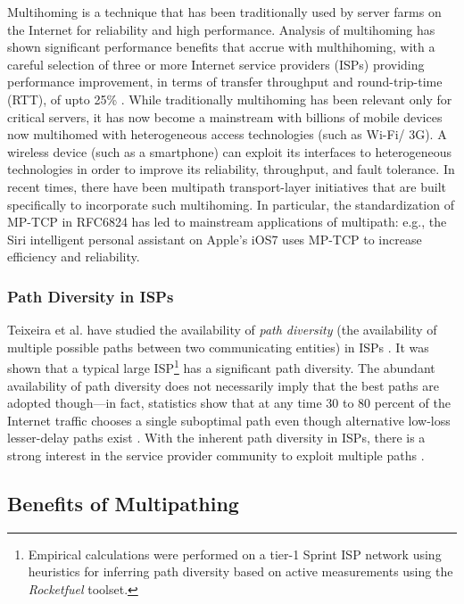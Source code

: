 \documentclass[10pt]{IEEEtran}
\begin{document}
Multihoming is a technique that has been traditionally used by server farms on the Internet for reliability and high performance. Analysis of multihoming has shown significant performance benefits that accrue with multhihoming, with a careful selection of three or more Internet service providers (ISPs) providing performance improvement, in terms of transfer throughput and round-trip-time (RTT), of upto 25\% \cite{akella2003measurement}. While traditionally multihoming has been relevant only for critical servers, it has now become a mainstream with billions of mobile devices now multihomed with heterogeneous access technologies (such as Wi-Fi/ 3G). A wireless device (such as a smartphone) can exploit its interfaces to heterogeneous technologies in order to improve its reliability, throughput, and fault tolerance. In recent times, there have been multipath transport-layer initiatives that are built specifically to incorporate such multihoming. In particular, the standardization of MP-TCP \cite{Paasch:2014:MT:2580723.2578901} in RFC6824 has led to mainstream applications of multipath: e.g., the Siri intelligent personal assistant on Apple's iOS7 uses MP-TCP to increase efficiency and reliability.  






\vspace{1mm}
\subsubsection{Path Diversity in ISPs}  Teixeira et al. have studied the availability of \textit{path diversity} (the availability of multiple possible paths between two communicating entities) in ISPs \cite{teixeira2003search}. It was shown that a typical large ISP\footnote{Empirical calculations were performed on a tier-1 Sprint ISP network using heuristics for inferring path diversity based on active measurements using the \textit{Rocketfuel} \cite{spring2002measuring} toolset.} has a significant path diversity. The abundant availability of path diversity does not necessarily imply that the best paths are adopted though---in fact, statistics show that at any time 30 to 80 percent of the Internet traffic chooses a single suboptimal path even though alternative low-loss lesser-delay paths exist \cite{savage1999end}. With the inherent path diversity in ISPs, there is a strong interest in the service provider community to exploit multiple paths \cite{he2008toward}. 


\subsection{Benefits of Multipathing}
\label{subsec:benefits}
\end{document}
